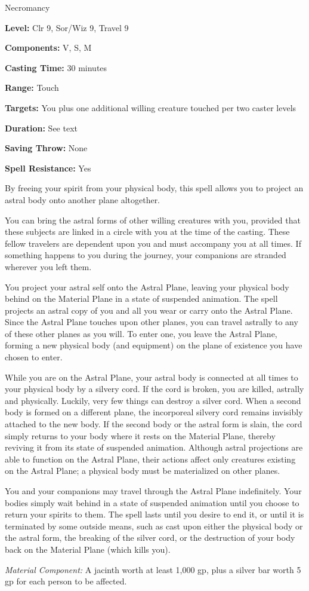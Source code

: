 
Necromancy

\textbf{Level:} Clr 9, Sor/Wiz 9, Travel 9

\textbf{Components:} V, S, M

\textbf{Casting Time:} 30 minutes

\textbf{Range:} Touch

\textbf{Targets:} You plus one additional willing creature touched per two caster 
levels

\textbf{Duration:} See text

\textbf{Saving Throw:} None

\textbf{Spell Resistance:} Yes

By freeing your spirit from your physical body, this spell allows you to project 
an astral body onto another plane altogether.

You can bring the astral forms of other willing creatures with you, provided that 
these subjects are linked in a circle with you at the time of the casting. These 
fellow travelers are dependent upon you and must accompany you at all times. If 
something happens to you during the journey, your companions are stranded wherever 
you left them.

You project your astral self onto the Astral Plane, leaving your physical body 
behind on the Material Plane in a state of suspended animation. The spell projects 
an astral copy of you and all you wear or carry onto the Astral Plane. Since the 
Astral Plane touches upon other planes, you can travel astrally to any of these 
other planes as you will. To enter one, you leave the Astral Plane, forming a new 
physical body (and equipment) on the plane of existence you have chosen to enter.

While you are on the Astral Plane, your astral body is connected at all times to 
your physical body by a silvery cord. If the cord is broken, you are killed, astrally 
and physically. Luckily, very few things can destroy a silver cord. When a second 
body is formed on a different plane, the incorporeal silvery cord remains invisibly 
attached to the new body. If the second body or the astral form is slain, the cord 
simply returns to your body where it rests on the Material Plane, thereby reviving 
it from its state of suspended animation. Although astral projections are able 
to function on the Astral Plane, their actions affect only creatures existing on 
the Astral Plane; a physical body must be materialized on other planes.

You and your companions may travel through the Astral Plane indefinitely. Your 
bodies simply wait behind in a state of suspended animation until you choose to 
return your spirits to them. The spell lasts until you desire to end it, or until 
it is terminated by some outside means, such as  cast upon 
either the physical body or the astral form, the breaking of the silver cord, or 
the destruction of your body back on the Material Plane (which kills you).

\textit{Material Component:} A jacinth worth at least 1,000 gp, plus a silver bar 
worth 5 gp for each person to be affected.

